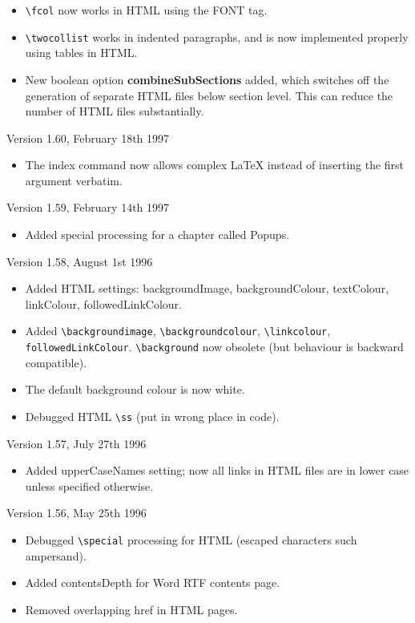 \begin{itemize}\itemsep=0pt
\item \verb$\fcol$ now works in HTML using the FONT tag.
\item \verb$\twocollist$ works in indented paragraphs, and is now
implemented properly using tables in HTML.
\item New boolean option {\bf combineSubSections} added, which switches off
the generation of separate HTML files below section level. This can reduce the
number of HTML files substantially.
\end{itemize}

Version 1.60, February 18th 1997

\begin{itemize}\itemsep=0pt
\item The index command now allows complex LaTeX instead of inserting the
first argument verbatim.
\end{itemize}

Version 1.59, February 14th 1997

\begin{itemize}\itemsep=0pt
\item Added special processing for a chapter called Popups.
\end{itemize}

Version 1.58, August 1st 1996

\begin{itemize}\itemsep=0pt
\item Added HTML settings: backgroundImage, backgroundColour, textColour,
linkColour, followedLinkColour. 
\item Added \verb$\backgroundimage$, \verb$\backgroundcolour$, \verb$\linkcolour$,
\verb$followedLinkColour$. \verb$\background$ now obsolete (but behaviour is
backward compatible).
\item The default background colour is now white.
\item Debugged HTML \verb$\ss$ (put in wrong place in code).
\end{itemize}

Version 1.57, July 27th 1996

\begin{itemize}\itemsep=0pt
\item Added upperCaseNames setting; now all links in HTML files are in lower
case unless specified otherwise.
\end{itemize}

Version 1.56, May 25th 1996

\begin{itemize}\itemsep=0pt
\item Debugged \verb$\special$ processing for HTML (escaped characters such ampersand).
\item Added contentsDepth for Word RTF contents page.
\item Removed overlapping href in HTML pages.
\end{itemize}

